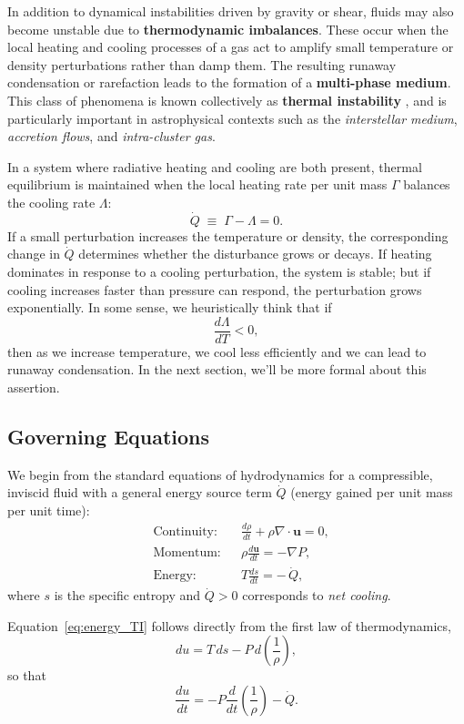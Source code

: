 In addition to dynamical instabilities driven by gravity or shear, fluids may also become unstable due to \textbf{thermodynamic imbalances}. These occur when the local heating and cooling processes of a gas act to amplify small temperature or density perturbations rather than damp them. The resulting runaway condensation or rarefaction leads to the formation of a \textbf{multi-phase medium}. This class of phenomena is known collectively as \textbf{thermal instability} \citet{1965ApJ...142..531F}, and is particularly important in astrophysical contexts such as the \emph{interstellar medium}, \emph{accretion flows}, and \emph{intra-cluster gas}.
\par
In a system where radiative heating and cooling are both present, thermal equilibrium is maintained when the local heating rate per unit mass $\Gamma$ balances the cooling rate $\Lambda$:
\begin{equation}
\dot{Q} \;\equiv\; \Gamma - \Lambda = 0.
\end{equation}
If a small perturbation increases the temperature or density, the corresponding change in $\dot{Q}$ determines whether the disturbance grows or decays. If heating dominates in response to a cooling perturbation, the system is stable; but if cooling increases faster than pressure can respond, the perturbation grows exponentially. In some sense, we heuristically think that if
\[
\frac{d\Lambda }{dT} < 0,
\]
then as we increase temperature, we cool less efficiently and we can lead to runaway condensation. In the next section, we'll be more formal about this assertion.

\subsection*{Governing Equations}

We begin from the standard equations of hydrodynamics for a compressible, inviscid fluid with a general energy source term $\dot{Q}$ (energy gained per unit mass per unit time):
\begin{align}
&\text{Continuity:} && \frac{d\rho}{dt} + \rho \nabla\!\cdot\!\mathbf{u} = 0, \label{eq:cont_TI}\\[4pt]
&\text{Momentum:} && \rho \frac{d\mathbf{u}}{dt} = -\nabla P, \label{eq:mom_TI}\\[4pt]
&\text{Energy:} && T \frac{ds}{dt} = -\,\dot{Q}, \label{eq:energy_TI}
\end{align}
where $s$ is the specific entropy and $\dot{Q}>0$ corresponds to \emph{net cooling}.  
\par
Equation~\eqref{eq:energy_TI} follows directly from the first law of thermodynamics,
\[
du = T\,ds - P\,d\!\left(\frac{1}{\rho}\right),
\]
so that
\[
\frac{du}{dt} = -P\frac{d}{dt}\!\left(\frac{1}{\rho}\right) - \dot{Q}.
\]

